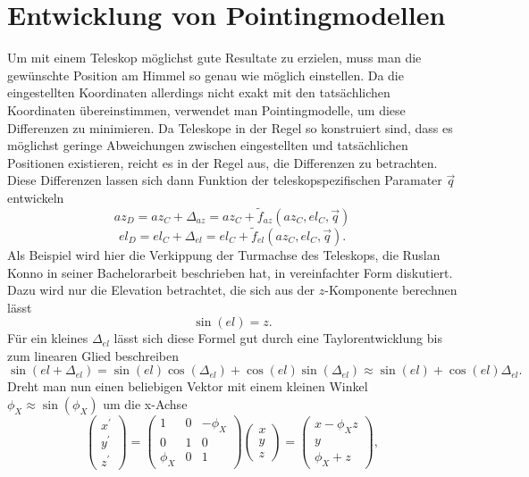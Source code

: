 \section{Entwicklung von Pointingmodellen}
Um mit einem Teleskop möglichst gute Resultate zu erzielen, muss man die gewünschte Position am Himmel so genau wie möglich einstellen. Da die eingestellten Koordinaten allerdings nicht exakt mit den tatsächlichen Koordinaten übereinstimmen, verwendet man Pointingmodelle, um diese Differenzen zu minimieren. Da Teleskope in der Regel so konstruiert sind, dass es möglichst geringe Abweichungen zwischen eingestellten und tatsächlichen Positionen existieren, reicht es in der Regel aus, die Differenzen zu betrachten. Diese Differenzen lassen sich dann Funktion der teleskopspezifischen Paramater $\vec{q}$ entwickeln
\begin{equation}
az_D=az_C+\Delta_{az}=az_C+\tilde{f}_{az}\left(az_C,el_C,\vec{q}\right)
\label{eq:PointingZero-}
\end{equation}
\begin{equation}
el_D=el_C+\Delta_{el}=el_C+\tilde{f}_{el}\left(az_C,el_C,\vec{q}\right).
\label{eq:pointingZero}
\end{equation}
Als Beispiel wird hier die Verkippung der Turmachse des Teleskops, die Ruslan Konno in seiner Bachelorarbeit \cite{Ruslan} beschrieben hat, in vereinfachter Form diskutiert. Dazu wird nur die Elevation betrachtet, die sich aus der $z$-Komponente berechnen lässt
\begin{equation}
\sin(el)=z.
\end{equation}
Für ein kleines $\Delta_{el}$ lässt sich diese Formel gut durch eine Taylorentwicklung bis zum linearen Glied beschreiben
\begin{equation}
\sin(el+\Delta_{el})=\sin(el)\cos(\Delta_{el})+\cos(el)\sin(\Delta_{el})\approx \sin(el)+\cos(el)\Delta_{el}.
\label{eq:approx}
\end{equation}
Dreht man nun einen beliebigen Vektor mit einem kleinen Winkel $\phi_X \approx \sin(\phi_X)$ um die x-Achse
\begin{equation}
\left(\begin{array}{c}
x^{\prime}\\y^{\prime}\\z^{\prime}
\end{array}\right)=\left(\begin{array}{ccc}
1 & 0 & -\phi_X\\0 & 1 & 0 \\\phi_X & 0 & 1
\end{array}\right)\left(\begin{array}{c}
x\\y\\z
\end{array}\right)=\left(\begin{array}{c}
x-\phi_Xz\\y\\\phi_X+z
\end{array}\right),
\end{equation}
